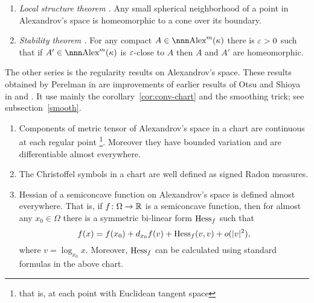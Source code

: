 \documentclass{article}
\begin{document}
\begin{enumerate}[$\diamond$]

\item{\it Local structure theorem \cite{perelman:morse}.}
Any small spherical neighborhood of a point in Alexandrov's space is homeomorphic to a cone over its boundary.

\item{\it Stability theorem \cite{perelman:spaces2}.} 
For any compact $A\in \Alex^m(\kappa)$ there is $\varepsilon>0$ such that if $A'\in \Alex^m(\kappa)$ is $\varepsilon$-close to $A$ then $A$ and $A'$ are homeomorphic.

\end{enumerate}
The other series is the regularity results on Alexandrov's space. 
These results obtained by Perelman in \cite{perelman:DC} 
are improvements of earlier results of Otsu and Shioya in \cite{otsu-shioya} and \cite{otsu:second-der}. 
It use mainly
the corollary~\ref{cor:conv-chart} and the smoothing trick; see subsection~\ref{smooth}. 
\begin{enumerate}[$\diamond$]
\item Components of metric tensor of Alexandrov's space in a chart are continuous
at each regular point%
\footnote{that is, at each point with Euclidean tangent space}. 
Moreover they have bounded variation and are differentiable almost everywhere.
\item The Christoffel symbols  in a chart are well defined as signed Radon measures.
\item Hessian of a semiconcave function on Alexandrov's space is defined almost
everywhere. 
That is, if $f\colon\Omega\to\mathbb{R}$ is a semiconcave function, then for almost
any $x_0\in \Omega$ there is a symmetric bi-linear form $\operatorname{Hess}_f$ such that
$$f(x)
=
f(x_0)+d_{x_0}f(v)+\operatorname{Hess}_f(v,v)+o(|v|^2),$$
where $v=\log_{x_0}x$. 
Moreover, $\operatorname{Hess}_f$ can be calculated using  standard formulas in the above
chart.
\end{enumerate}
\end{document}
